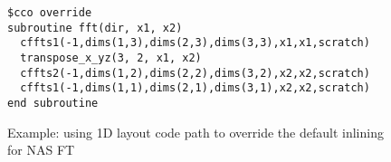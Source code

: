 \begin{figure}[h]
{\scriptsize
\begin{verbatim}
$cco override
subroutine fft(dir, x1, x2)
  cffts1(-1,dims(1,3),dims(2,3),dims(3,3),x1,x1,scratch)
  transpose_x_yz(3, 2, x1, x2)
  cffts2(-1,dims(1,2),dims(2,2),dims(3,2),x2,x2,scratch)
  cffts1(-1,dims(1,1),dims(2,1),dims(3,1),x2,x2,scratch)
end subroutine
\end{verbatim}
}
\caption{Example: using 1D layout code path to override the default inlining for NAS FT}
\label{fig:annot:ft}
\end{figure}



